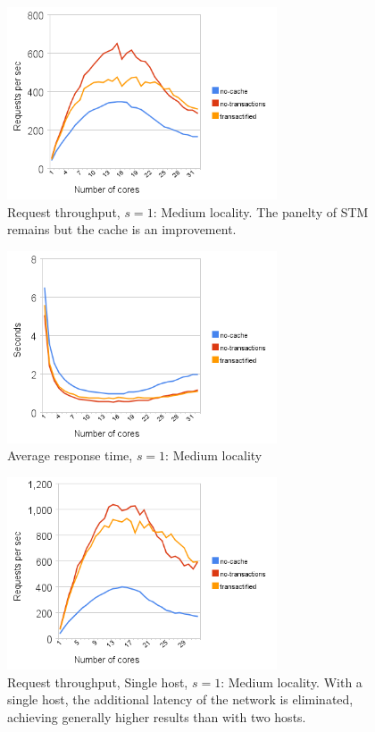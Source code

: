 \documentclass[preprint,11pt]{sigplanconf}
\begin{document}
\begin{figure}
 \begin{center}
  \includegraphics[width=8cm]{transaction-rate-client-server-1.png}
 \end{center}
 \caption{Request throughput, $s = 1$: Medium locality.
          The panelty of STM remains but the cache is an improvement.}
 \label{fig:request-throughput-1}
\end{figure}
\begin{figure}
 \begin{center}
  \includegraphics[width=8cm]{response-time-client-server-1.png}
 \end{center}
 \caption{Average response time, $s = 1$: Medium locality}
 \label{fig:response-time-1}
\end{figure}
\begin{figure}
 \begin{center}
  \includegraphics[width=8cm]{transaction-rate-single-host-1.png}
 \end{center}
 \caption{Request throughput, Single host, $s = 1$: Medium locality.
          With a single host, the additional latency of the network is
          eliminated, achieving generally higher results than with two hosts. }
 \label{fig:request-throughput-single-host-1}
\end{figure}
\end{document}
